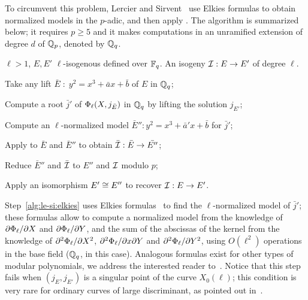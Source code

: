 To circumvent this problem, Lercier and
Sirvent~\cite{lercier+sirvent08} use Elkies formulas to obtain
normalized models in the $p$-adic, and then apply
\hyperref[alg:bmss]{}. The algorithm is summarized below; it
requires $p\ge5$ and it makes computations in an unramified extension
of degree $d$ of $\mathbb{Q}_p$, denoted by $\mathbb{Q}_q$.

\begin{algorithm*}
  \caption{\label{alg:le-si}}
  \begin{algorithmic}[1]
    \REQUIRE $\ell>1$, $E,E'$ $\ell$-isogenous defined over $\mathbb{F}_q$.
    \ENSURE An isogeny $\mathcal{I}:E\rightarrow E'$ of degree $\ell$.

    \STATE \label{alg:le-si:lift1}Take any lift
    $\bar{E}\;:\;y^2=x^3+\bar{a}x+\bar{b}$ of $E$ in $\mathbb{Q}_q$;
    
    \STATE \label{alg:le-si:modpol}Compute a root $\bar{j}'$ of
    $\Phi_\ell(X,j_{\bar{E}})$ in $\mathbb{Q}_q$ by lifting the solution
    $j_{E'}$;
    
    \STATE \label{alg:le-si:elkies} Compute an $\ell$-normalized model
    $\bar{E}'':y^2=x^3+\bar{a}'x+\bar{b}$ for $\bar{j}'$;
    
    \STATE \label{alg:le-si:bmss}Apply \hyperref[alg:bmss]{} to $\bar{E}$ and
    $\bar{E}''$ to obtain $\bar{\mathcal{I}}:\bar{E}\rightarrow\bar{E''}$;
    
    \STATE \label{alg:le-si:reduce}Reduce $\bar{E}''$ and $\bar{\mathcal{I}}$
    to $E''$ and $\mathcal{I}$ modulo $p$;
    
    \STATE \label{alg:le-si:isom}Apply an isomorphism $E'\cong E''$ to
    recover $\mathcal{I}:E\rightarrow E'$.
  \end{algorithmic}
\end{algorithm*}

Step~\ref{alg:le-si:elkies} uses Elkies formulas~\cite{elkies98} to
find the $\ell$-normalized model of $\bar{j}'$; these formulas allow
to compute a normalized model from the knowledge of
$\partial\Phi_\ell/\partial X$ and $\partial\Phi_\ell/\partial
Y$, and the sum of the abscissas of the kernel from the knowledge of
$\partial^2\Phi_\ell/\partial X^2$,
$\partial^2\Phi_\ell/\partial x\partial Y$ and
$\partial^2\Phi_\ell/\partial Y^2$, using $O(\ell^2)$
operations in the base field ($\mathbb{Q}_q$, in this case). Analogous
formulas exist for other types of modular polynomials, we address the
interested reader
to~\cite{schoof95,morain95,elkies98,lercier-algorithmique}. Notice
that this step fails when $(j_E,j_{E'})$ is a singular point of the
curve $X_0(\ell)$; this condition is very rare for ordinary curves of
large discriminant, as pointed out in~\cite[$\S7$]{schoof95}.

